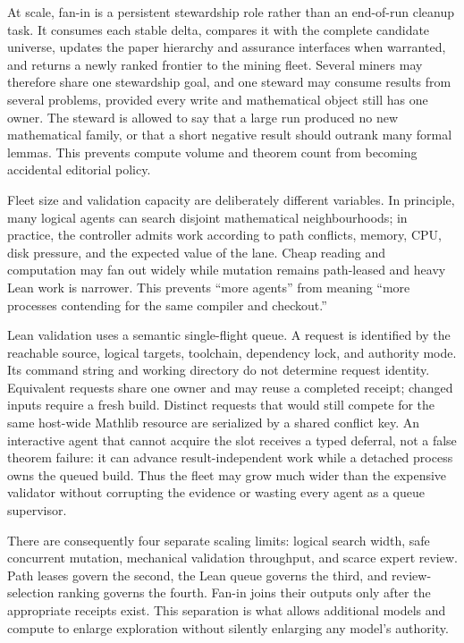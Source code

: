 \documentclass[10pt]{article}
\begin{document}
At scale, fan-in is a persistent stewardship role rather than an end-of-run
cleanup task. It consumes each stable delta, compares it with the complete
candidate universe, updates the paper hierarchy and assurance interfaces when
warranted, and returns a newly ranked frontier to the mining fleet. Several
miners may therefore share one stewardship goal, and one steward may consume
results from several problems, provided every write and mathematical object
still has one owner. The steward is allowed to say that a large run produced
no new mathematical family, or that a short negative result should outrank
many formal lemmas. This prevents compute volume and theorem count from
becoming accidental editorial policy.

Fleet size and validation capacity are deliberately different variables. In
principle, many logical agents can search disjoint mathematical neighbourhoods;
in practice, the controller admits work according to path conflicts, memory,
CPU, disk pressure, and the expected value of the lane. Cheap reading and
computation may fan out widely while mutation remains path-leased and heavy
Lean work is narrower. This prevents ``more agents'' from meaning ``more
processes contending for the same compiler and checkout.''

Lean validation uses a semantic single-flight queue. A request is identified
by the reachable source, logical targets, toolchain, dependency lock, and
authority mode. Its command string and working directory do not determine
request identity.
Equivalent requests share one owner and may reuse a completed receipt; changed
inputs require a fresh build. Distinct requests that would still compete for
the same host-wide Mathlib resource are serialized by a shared conflict key.
An interactive agent that cannot acquire the slot receives a typed deferral,
not a false theorem failure: it can advance result-independent work while a
detached process owns the queued build. Thus the fleet may grow much wider
than the expensive validator without corrupting the evidence or wasting every
agent as a queue supervisor.

There are consequently four separate scaling limits: logical search width,
safe concurrent mutation, mechanical validation throughput, and scarce expert
review. Path leases govern the second, the Lean queue governs the third, and
review-selection ranking governs the fourth. Fan-in joins their outputs only after
the appropriate receipts exist. This separation is what allows additional
models and compute to enlarge exploration without silently enlarging any
model's authority.
\end{document}
